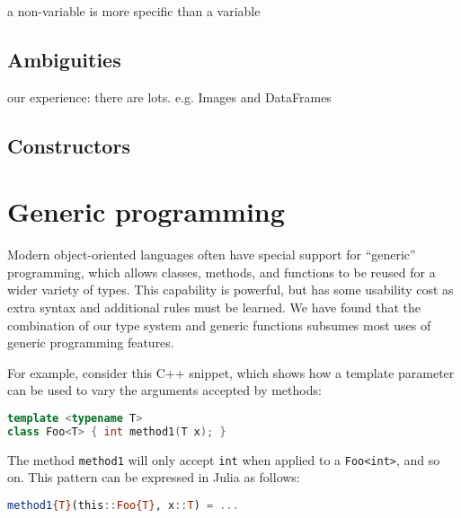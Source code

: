a non-variable is more specific than a variable

\subsection{Ambiguities}

our experience: there are lots.
e.g. Images and DataFrames

\subsection{Constructors}

\section{Generic programming}

Modern object-oriented languages often have special support for ``generic''
programming, which allows classes, methods, and functions to be reused
for a wider variety of types.
This capability is powerful, but has some usability cost as extra
syntax and additional rules must be learned.
We have found that the combination of our type system and generic functions
subsumes most uses of generic programming features.

For example, consider this C++ snippet, which shows how a template
parameter can be used to vary the arguments accepted by methods:

\begin{singlespace}
\begin{lstlisting}[language=c++]
template <typename T>
class Foo<T> { int method1(T x); }
\end{lstlisting}
\end{singlespace}

\noindent
The method \texttt{method1} will only accept \texttt{int} when applied to
a \texttt{Foo<int>}, and so on.
This pattern can be expressed in Julia as follows:

\begin{singlespace}
\begin{lstlisting}[language=julia]
method1{T}(this::Foo{T}, x::T) = ...
\end{lstlisting}
\end{singlespace}




